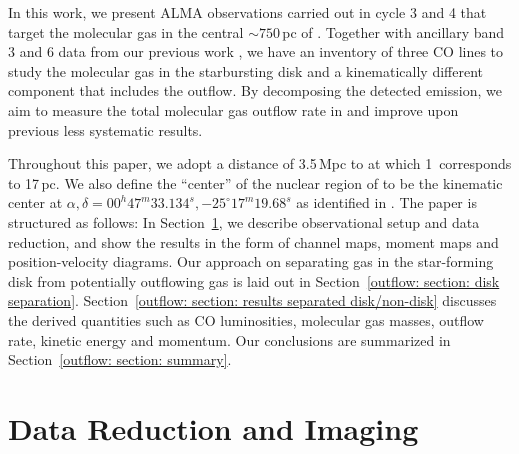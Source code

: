 In this work, we present ALMA  observations carried out in cycle 3 and 4 that target the molecular gas in the central $\sim 750$\,pc of . Together with ancillary band 3 and 6 data from our previous work \citep{2013Natur.499..450B,2015ApJ...801...63M,Leroy:2015ds,2018ApJ...867..111Z}, we have an inventory of three CO lines to study the molecular gas in the starbursting disk and a kinematically different component that includes the outflow. By decomposing the detected emission, we aim to measure the total molecular gas outflow rate in  and improve upon previous less systematic results.

Throughout this paper, we adopt a distance of 3.5\,Mpc to  \citep{Rekola:2005ha} at which 1\arcsec\ corresponds to 17\,pc. We also define the ``center'' of the nuclear region of  to be the kinematic center at $\alpha, \delta = 00^h47^m33.134^s, -25^\circ17^m19.68^s$ as identified in \citet{MullerSanchez:2010dr}.
The paper is structured as follows: In Section~\ref{outflow: section: data reduction}, we describe observational setup and data reduction, and show the results in the form of channel maps, moment maps and position-velocity diagrams. Our approach on separating gas in the star-forming disk from potentially outflowing gas is laid out in Section~\ref{outflow: section: disk separation}. Section~\ref{outflow: section: results separated disk/non-disk} discusses the derived quantities such as CO luminosities, molecular gas masses, outflow rate, kinetic energy and momentum. Our conclusions are summarized in Section~\ref{outflow: section: summary}.



\section{Data Reduction and Imaging}
\label{outflow: section: data reduction}

